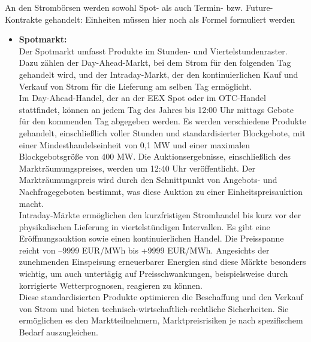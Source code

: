 An den Strombörsen werden sowohl Spot- als auch Termin- bzw. Future-Kontrakte gehandelt:
Einheiten müssen hier noch als Formel formuliert werden
\begin{itemize}[label={--}]
	
\item \textbf{Spotmarkt:}\\ Der Spotmarkt umfasst Produkte im Stunden- und Viertelstundenraster. Dazu zählen der Day-Ahead-Markt, bei dem Strom für den folgenden Tag gehandelt wird, und der Intraday-Markt, der den kontinuierlichen Kauf und Verkauf von Strom für die Lieferung am selben Tag ermöglicht.\\

Im Day-Ahead-Handel, der an der EEX Spot oder im OTC-Handel stattfindet, können an jedem Tag des Jahres bis 12:00 Uhr mittags Gebote für den kommenden Tag abgegeben werden. Es werden verschiedene Produkte gehandelt, einschließlich voller Stunden und standardisierter Blockgebote, mit einer Mindesthandelseinheit von 0,1 MW und einer maximalen Blockgebotsgröße von 400 MW. Die Auktionsergebnisse, einschließlich des Markträumungspreises, werden um 12:40 Uhr veröffentlicht. Der Markträumungspreis wird durch den Schnittpunkt von Angebots- und Nachfragegeboten bestimmt, was diese Auktion zu einer Einheitspreisauktion macht.\\

Intraday-Märkte ermöglichen den kurzfristigen Stromhandel bis kurz vor der physikalischen Lieferung in viertelstündigen Intervallen. Es gibt eine Eröffnungsauktion sowie einen kontinuierlichen Handel. Die Preisspanne reicht von –9999 EUR/MWh bis +9999 EUR/MWh. Angesichts der zunehmenden Einspeisung erneuerbarer Energien sind diese Märkte besonders wichtig, um auch untertägig auf Preisschwankungen, beispielsweise durch korrigierte Wetterprognosen, reagieren zu können.\\

Diese standardisierten Produkte optimieren die Beschaffung und den Verkauf von Strom und bieten technisch-wirtschaftlich-rechtliche Sicherheiten. Sie ermöglichen es den Marktteilnehmern, Marktpreisrisiken je nach spezifischem Bedarf auszugleichen.\\


\end{itemize}
